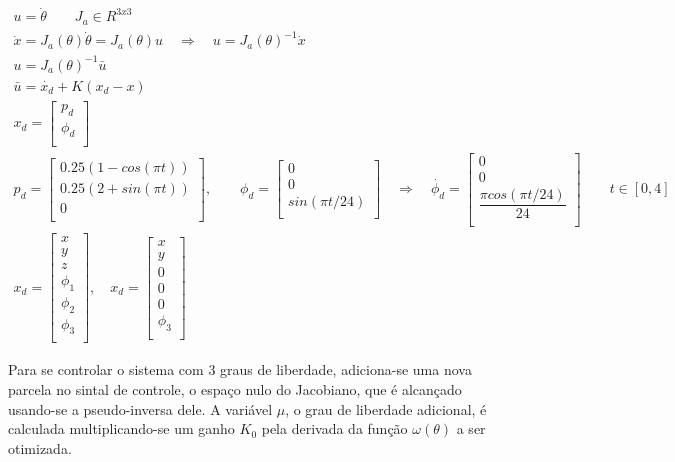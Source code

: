 \documentclass[a4paper,11pt]{article}
\theoremstyle{mytheor}
\begin{document}
\begin{gather*}
	u = \dot{\theta} \qquad J_a \in R^{3x3} \\
	\dot{x} = J_a(\theta)\dot{\theta} = J_a(\theta)u \quad \Rightarrow \quad
	u = J_a(\theta)^{-1}\dot{x} \\
	u = J_a(\theta)^{-1} \bar{u} \\
	\bar{u} = \dot{x_d} + K (x_d - x) \\
	x_d = 
	\begin{bmatrix} 
	p_d \\ 
	\phi_d \\
	\end{bmatrix} \\
	p_{d} = 
	\begin{bmatrix} 
	0.25 (1 - cos(\pi t)) \\ 
	0.25 (2 + sin(\pi t)) \\
	0 \\
	\end{bmatrix}, \qquad 
	\phi_{d} = 
	\begin{bmatrix} 
	0 \\ 
	0 \\
	sin(\pi t / 24) \\
	\end{bmatrix} \quad \Rightarrow \quad 
	\dot{\phi_d} = 
	\begin{bmatrix} 
	0 \\
	0 \\
	\dfrac{\pi cos(\pi t / 24)}{24} \\
	\end{bmatrix} \qquad t \in [0,4] \\
	x_d = 
	\begin{bmatrix} 
	x \\ 
	y \\
	z \\
	\phi_1 \\
	\phi_2 \\
	\phi_3 \\
	\end{bmatrix}, \quad
	x_d = 
	\begin{bmatrix} 
	x \\ 
	y \\
	0 \\
	0 \\
	0 \\
	\phi_3 \\
	\end{bmatrix}
\end{gather*}

Para se controlar o sistema com 3 graus de liberdade, adiciona-se uma nova parcela no sintal de controle, o espaço nulo do Jacobiano, que é alcançado usando-se a pseudo-inversa dele. A variável $\mu$, o grau de liberdade adicional, é calculada multiplicando-se um ganho $K_0$ pela derivada da função $\omega(\theta)$ a ser otimizada.
\end{document}

